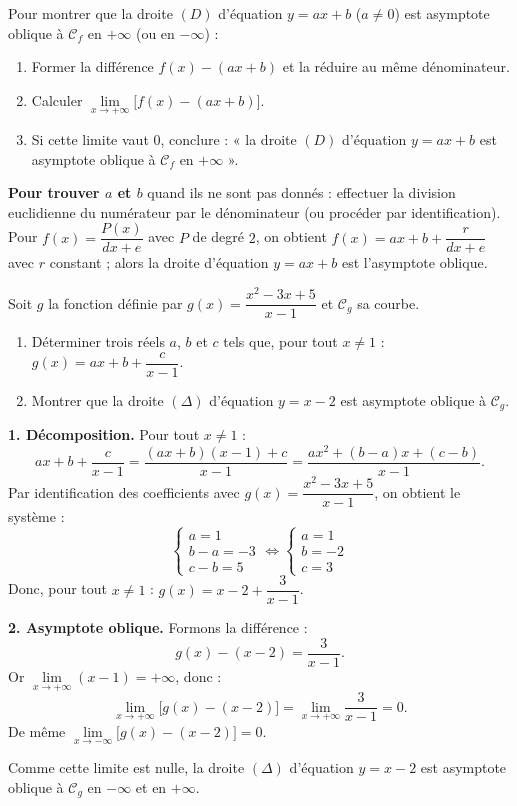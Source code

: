 \documentclass[11pt]{article}
\begin{document}
\begin{methode}
Pour montrer que la droite $(D)$ d'équation $y=ax+b$ ($a\neq 0$) est asymptote oblique à $\mathcal{C}_f$ en $+\infty$ (ou en $-\infty$) :
\begin{enumerate}
\item Former la différence $f(x)-(ax+b)$ et la réduire au même dénominateur.
\item Calculer $\lim\limits_{x\to+\infty}\big[f(x)-(ax+b)\big]$.
\item Si cette limite vaut $\boxed{0}$, conclure : « la droite $(D)$ d'équation $y=ax+b$ est asymptote oblique à $\mathcal{C}_f$ en $+\infty$ ».
\end{enumerate}
\textbf{Pour trouver $a$ et $b$} quand ils ne sont pas donnés : effectuer la division euclidienne du numérateur par le dénominateur (ou procéder par identification). Pour $f(x)=\dfrac{P(x)}{dx+e}$ avec $P$ de degré $2$, on obtient $f(x)=ax+b+\dfrac{r}{dx+e}$ avec $r$ constant ; alors la droite d'équation $y=ax+b$ est l'asymptote oblique.
\end{methode}

\begin{exoresolu}
Soit $g$ la fonction définie par $g(x)=\dfrac{x^2-3x+5}{x-1}$ et $\mathcal{C}_g$ sa courbe.
\begin{enumerate}
\item Déterminer trois réels $a$, $b$ et $c$ tels que, pour tout $x\neq 1$ : $g(x)=ax+b+\dfrac{c}{x-1}$.
\item Montrer que la droite $(\Delta)$ d'équation $y=x-2$ est asymptote oblique à $\mathcal{C}_g$.
\end{enumerate}
\tcblower
\textbf{1. Décomposition.} Pour tout $x\neq 1$ :
\[ax+b+\dfrac{c}{x-1}=\dfrac{(ax+b)(x-1)+c}{x-1}=\dfrac{ax^2+(b-a)x+(c-b)}{x-1}.\]
Par identification des coefficients avec $g(x)=\dfrac{x^2-3x+5}{x-1}$, on obtient le système :
\[\begin{cases} a=1 \\ b-a=-3 \\ c-b=5 \end{cases} \iff \begin{cases} a=1 \\ b=-2 \\ c=3 \end{cases}\]
Donc, pour tout $x\neq 1$ : $\boxed{g(x)=x-2+\dfrac{3}{x-1}}$.

\textbf{2. Asymptote oblique.} Formons la différence :
\[g(x)-(x-2)=\dfrac{3}{x-1}.\]
Or $\lim\limits_{x\to+\infty}(x-1)=+\infty$, donc :
\[\lim_{x\to+\infty}\big[g(x)-(x-2)\big]=\lim_{x\to+\infty}\dfrac{3}{x-1}=0.\]
De même $\lim\limits_{x\to-\infty}\big[g(x)-(x-2)\big]=0$.

Comme cette limite est nulle, la droite $(\Delta)$ d'équation $y=x-2$ est asymptote oblique à $\mathcal{C}_g$ en $-\infty$ et en $+\infty$.
\end{exoresolu}
\end{document}
